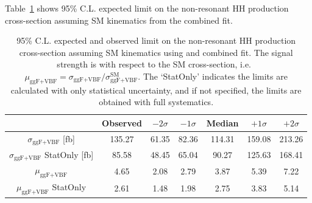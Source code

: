 Table~\ref{sec:fit:tab:SMCombinedLimits} shows 95\% C.L. expected limit on the non-resonant
HH production cross-section assuming SM kinematics from the combined fit.


\begin{table}[htbp]
\centering
\begin{tabular}{|c|c|c|c|c|c|c|}
\hline
& Observed & $-2\sigma$ & $-1\sigma$ & Median & $+1\sigma$ & $+2\sigma$\\
\hline
$\sigma_\text{ggF+VBF}$ [fb] & 135.27   & 61.35  &   82.36  &   114.31   &   159.08  &   213.26 \\ 
\hline
$\sigma_\text{ggF+VBF}$ StatOnly [fb] & 85.58  &    48.45  &   65.04  &  90.27  &   125.63  &   168.41 \\ 
\hline
$\mu_\text{ggF+VBF}$ & 4.65  &     2.08   &    2.79   &    3.87  &    5.39  &    7.22 \\ 
\hline
$\mu_\text{ggF+VBF}$ StatOnly & 2.61   &    1.48   &    1.98   &    2.75   &    3.83  &    5.14 \\ 
\hline
\end{tabular}
\caption{95\% C.L. expected and observed limit on the non-resonant HH production cross-section 
assuming SM kinematics using \lephad and \hadhad combined fit.
The signal strength is with respect to the 
SM cross-section, i.e.\ 
$\mu_\text{ggF+VBF}=\sigma_\text{ggF+VBF}/\sigma_\text{ggF+VBF}^\text{SM}$.
The `StatOnly' indicates the limits are calculated with only statistical uncertainty,
and if not specified, the limits are obtained with full systematics.}
\label{sec:fit:tab:SMCombinedLimits}
\end{table}

